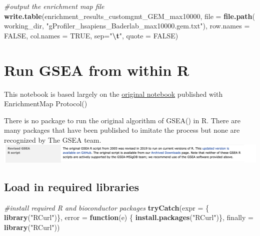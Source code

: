 \documentclass[
]{book}
\newenvironment{Shaded}{\begin{snugshade}}{\end{snugshade}}
\newcommand{\AttributeTok}[1]{\textcolor[rgb]{0.13,0.29,0.53}{#1}}
\newcommand{\CommentTok}[1]{\textcolor[rgb]{0.56,0.35,0.01}{\textit{#1}}}
\newcommand{\ConstantTok}[1]{\textcolor[rgb]{0.56,0.35,0.01}{#1}}
\newcommand{\ControlFlowTok}[1]{\textcolor[rgb]{0.13,0.29,0.53}{\textbf{#1}}}
\newcommand{\FunctionTok}[1]{\textcolor[rgb]{0.13,0.29,0.53}{\textbf{#1}}}
\newcommand{\NormalTok}[1]{#1}
\newcommand{\SpecialCharTok}[1]{\textcolor[rgb]{0.81,0.36,0.00}{\textbf{#1}}}
\newcommand{\StringTok}[1]{\textcolor[rgb]{0.31,0.60,0.02}{#1}}
\begin{document}
\begin{Shaded}
\begin{Highlighting}[]
\CommentTok{\#output the enrichment map file}
\FunctionTok{write.table}\NormalTok{(enrichment\_results\_customgmt\_GEM\_max10000, }
                  \AttributeTok{file =} \FunctionTok{file.path}\NormalTok{(}
\NormalTok{                    working\_dir, }\StringTok{"gProfiler\_hsapiens\_Baderlab\_max10000.gem.txt"}\NormalTok{),}
                  \AttributeTok{row.names =} \ConstantTok{FALSE}\NormalTok{, }
                  \AttributeTok{col.names =} \ConstantTok{TRUE}\NormalTok{, }\AttributeTok{sep=}\StringTok{"}\SpecialCharTok{\textbackslash{}t}\StringTok{"}\NormalTok{,}
                  \AttributeTok{quote =} \ConstantTok{FALSE}\NormalTok{)}
\end{Highlighting}
\end{Shaded}

\chapter{Run GSEA from within R}\label{run-gsea-from-within-r}

This notebook is based largely on the \href{https://baderlab.github.io/Cytoscape_workflows/EnrichmentMapPipeline/Protocol2_createEM.html}{original notebook} published with EnrichmentMap Protocol()

There is no package to run the original algorithm of GSEA() in R. There are many packages that have been published to imitate the process but none are recognized by The GSEA team.\\
\includegraphics{./images/gsea_r_package_message.png}

\section{Load in required libraries}\label{load-in-required-libraries}

\begin{Shaded}
\begin{Highlighting}[]
\CommentTok{\#install required R and bioconductor packages}
\FunctionTok{tryCatch}\NormalTok{(}\AttributeTok{expr =}\NormalTok{ \{ }\FunctionTok{library}\NormalTok{(}\StringTok{"RCurl"}\NormalTok{)\}, }
         \AttributeTok{error =} \ControlFlowTok{function}\NormalTok{(e) \{  }
           \FunctionTok{install.packages}\NormalTok{(}\StringTok{"RCurl"}\NormalTok{)\}, }
         \AttributeTok{finally =} \FunctionTok{library}\NormalTok{(}\StringTok{"RCurl"}\NormalTok{))}
\end{Highlighting}
\end{Shaded}
\end{document}

